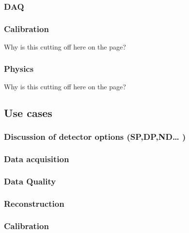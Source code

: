 \subsubsection{DAQ}
\label{ch:exec-comp-mod-intfc-daq}


\subsubsection{Calibration}
\label{ch:exec-comp-mod-intfc-calib}

Why is this cutting off here on the page?

\subsubsection{Physics}
\label{ch:exec-comp-mod-intfc-phys}

Why is this cutting off here on the page?

\subsection{Use cases}	
\label{ch:exec-comp-mod-use}


\subsubsection{Discussion of detector options (SP,DP,ND… )}
\label{ch:exec-comp-mod-use-opt}


\subsubsection{Data acquisition}
\label{ch:exec-comp-mod-use-daq}


\subsubsection{Data Quality}
\label{ch:exec-comp-mod-use-dq}


\subsubsection{Reconstruction}
\label{ch:exec-comp-mod-use-reco}


\subsubsection{Calibration}
\label{ch:exec-comp-mod-use-calib}


